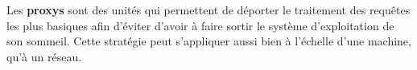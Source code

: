 
Les \textbf{proxys} sont des unités qui permettent de déporter le traitement
des requêtes les plus basiques afin d'éviter d'avoir à faire sortir le système
d'exploitation de son sommeil. Cette stratégie peut s'appliquer aussi bien à
l'échelle d'une machine, qu'à un réseau.
